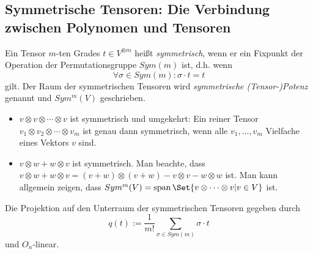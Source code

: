 \subsection{Symmetrische Tensoren: Die Verbindung zwischen Polynomen und Tensoren}

\begin{definition}\label{symmetrische_tensoren:def}
Ein Tensor $m$-ten Grades $t\in V^{\otimes m}$ heißt \emph{symmetrisch}, wenn er ein Fixpunkt der Operation der Permutationsgruppe $Sym(m)$ ist, d.h. wenn
\[\forall \sigma\in Sym(m): \sigma\cdot t = t\]
gilt. Der Raum der symmetrischen Tensoren wird \emph{symmetrische (Tensor-)Potenz} genannt und $Sym^m(V)$ geschrieben.
\end{definition}

\begin{example}
\begin{itemize}
\item $v\otimes v\otimes \cdots\otimes v$ ist symmetrisch und umgekehrt: Ein reiner Tensor $v_1\otimes v_2\otimes\cdots\otimes v_m$ ist genau dann symmetrisch, wenn alle $v_1,\ldots, v_m$ Vielfache eines Vektors $v$ sind.
\item $v\otimes w + w\otimes v$ ist symmetrisch. Man beachte, dass $v\otimes w + w\otimes v = (v+w)\otimes(v+w) - v\otimes v - w\otimes w$ ist. Man kann allgemein zeigen, dass $Sym^m(V) = \operatorname{span}\Set{v\otimes\cdots\otimes v | v\in V}$ ist.
\end{itemize}
\end{example}

\begin{lemma}[Mittelwerttrick]\label{symmetrische_tensoren:projektion}
Die Projektion auf den Unterraum der symmetrischen Tensoren gegeben durch
\[q(t) := \frac{1}{m!} \sum_{\sigma\in Sym(m)} \sigma\cdot t\]
und $O_n$-linear.
\end{lemma}

